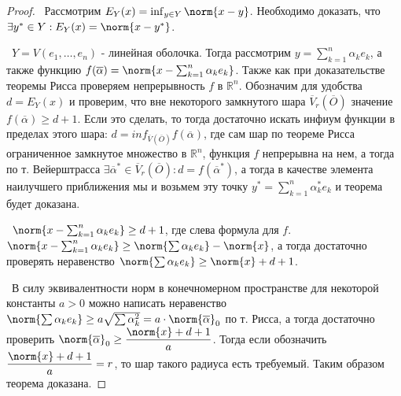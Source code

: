 \begin{proof}

\noindent \textbullet~Рассмотрим $E_Y(x) = \inf_{y \in Y} \norm{x - y}$. Необходимо доказать, что $\exists y^* \in Y : E_Y(x) = \norm{x - y^*}$.

\smallskip
\noindent \textbullet~$Y = V(e_1, \dots, e_n)$ - линейная оболочка. Тогда рассмотрим $y = \sum_{k = 1}^{n} \alpha_k e_k$, а также функцию $f(\overline{\alpha}) = 
\norm{x - \sum_{k = 1}^{n} \alpha_k e_k}$. Также как при доказательстве теоремы Рисса проверяем непрерывность $f$ в $\mathbb{R}^n$. Обозначим для удобства $d = E_Y(x)$
и проверим, что вне некоторого замкнутого шара $\overline{V}_r(\overline{O})$ значение $f(\overline{\alpha}) \ge d + 1$. Если это сделать, то тогда достаточно искать инфиум функции в пределах этого
шара: $d = inf_{\overline{V} (\overline{O})} f(\overline{\alpha})$, где сам шар по теореме Рисса ограниченное замкнутое множество в $\mathbb{R}^n$, функция $f$
непрерывна на нем, а тогда по т. Вейерштрасса $\exists \overline{\alpha}^* \in \overline{V}_r(\overline{O}) : d = f(\overline{\alpha}^*)$, а тогда в качестве элемента 
наилучшего приближения мы и возьмем эту точку $y^* = \sum_{k = 1}^{n} \alpha_k^* e_k$ и теорема будет доказана. 

\smallskip 
\noindent \textbullet~$\norm{x - \sum_{k = 1}^{n} \alpha_k e_k} \ge d + 1$, где слева формула для $f$. $\norm{x - \sum_{k = 1}^{n} \alpha_k e_k} \ge
\norm{\sum \alpha_k e_k} - \norm{x}$, а тогда достаточно проверять неравенство $\norm{\sum \alpha_k e_k} \ge \norm{x} + d + 1$.

\smallskip 
\noindent \textbullet~В силу эквивалентности норм в конечномерном пространстве для некоторой константы $a > 0$ можно написать неравенство $\norm{\sum \alpha_k e_k} \ge 
a \sqrt{\sum \alpha_k^2} = a \cdot \norm{\overline{\alpha}}_0$ по т. Рисса, а тогда достаточно проверить $\norm{\overline{\alpha}}_0 \ge \dfrac{\norm{x} + d + 1}{a}$.
Тогда если обозначить $\dfrac{\norm{x} + d + 1}{a} = r$, то шар такого радиуса есть требуемый. Таким образом теорема доказана.  
\end{proof}